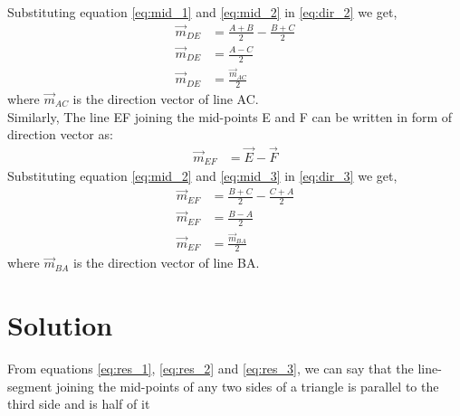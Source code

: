 \documentclass[journal,12pt,twocolumn]{IEEEtran}
\begin{document}
Substituting equation \eqref{eq:mid_1} and \eqref{eq:mid_2} in \eqref{eq:dir_2} we get,
\begin{align}
    \vec{m}_{DE}&=\frac{A+B}{2}-\frac{B+C}{2}\\
    \vec{m}_{DE}&=\frac{A-C}{2} \\
    \vec{m}_{DE}&=\frac{\vec{m}_{AC}}{2} \label{eq:res_2}
\end{align}
where $\vec{m}_{AC}$ is the direction vector of line AC.\\
Similarly, The line EF joining the mid-points E and F can be written in form of direction vector as:
\begin{align}
    \vec{m}_{EF}&=\vec{E}-\vec{F} \label{eq:dir_3}
\end{align}
Substituting equation \eqref{eq:mid_2} and \eqref{eq:mid_3} in \eqref{eq:dir_3} we get,
\begin{align}
    \vec{m}_{EF}&=\frac{B+C}{2}-\frac{C+A}{2}\\
    \vec{m}_{EF}&=\frac{B-A}{2} \\
    \vec{m}_{EF}&=\frac{\vec{m}_{BA}}{2} \label{eq:res_3}
\end{align}
where $\vec{m}_{BA}$ is the direction vector of line BA.\\

\section{Solution}
From equations \eqref{eq:res_1}, \eqref{eq:res_2} and \eqref{eq:res_3}, we can say that the line-segment joining the mid-points of any two sides of a triangle is parallel to the third side and is half of it
\\
\end{document}
